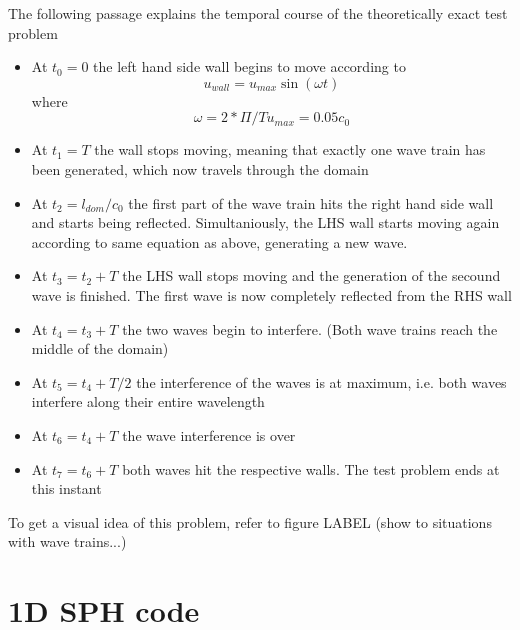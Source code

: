 \documentclass{report}
\begin{document}
The following passage explains the temporal course of the theoretically exact test problem

\begin{itemize} 
\item At $t_0=0$ the left hand side wall begins to move according to 
\begin{equation}
  u_{\mathit{wall}}=u_{\mathit{max}}\sin(\omega t) 
\end{equation}
  where 
\begin{equation}
\omega=2*\Pi/T u_{\mathit{max}}=0.05 c_0
\end{equation}


\item At $t_1=T$ the wall stops moving, meaning that exactly one wave train has been generated, which now travels through the domain

\item At $t_2=l_{\mathit{dom}}/c_0$ the first part of the wave train hits the right hand side  wall and starts being reflected. Simultaniously, the LHS wall starts moving again according to same equation as above, generating a new wave.

\item At $t_3=t_2+T$ the LHS wall stops moving and the generation of the secound wave is finished. 
The first wave is now completely reflected from the RHS wall

\item At $t_4=t_3+T$ the two waves begin to interfere. (Both wave trains reach the middle of the domain)

\item At $t_5=t_4+T/2$ the interference of the waves is at maximum, i.e. both waves interfere along their entire wavelength

\item At $t_6=t_4+T$ the wave interference is over

\item At $t_7=t_6+T$ both waves hit the respective walls. The test problem ends at this instant
\end{itemize}


To get a visual idea of this problem, refer to figure LABEL (show to situations with wave trains...)

 









\section{1D SPH code}
\label{sec:1DSPHcode}
\end{document}
